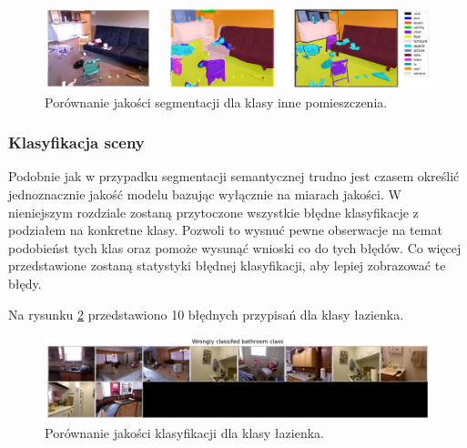 \begin{figure}[ht!]
    \centering
    \includegraphics[width=\textwidth]{img/preds_analysis/gt_vs_pred/other_indoor-3.png}
    \caption{Porównanie jakości segmentacji dla klasy inne pomieszczenia.}
    \label{fig:other_indoor-pred-3}
\end{figure}

\subsubsection{Klasyfikacja sceny}
Podobnie jak w przypadku segmentacji semantycznej trudno jest czasem określić jednoznacznie jakość modelu bazując wyłącznie na miarach jakości. W nieniejszym rozdziale zostaną przytoczone wszystkie błędne klasyfikacje z podziałem na konkretne klasy. Pozwoli to wysnuć pewne obserwacje na temat podobieńst tych klas oraz pomoże wysunąć wnioski co do tych błędów. Co więcej przedstawione zostaną statystyki błędnej klasyfikacji, aby lepiej zobrazować te błędy.

Na rysunku \ref{fig:bathroom-false-pred} przedstawiono 10 błędnych przypisań dla klasy łazienka.  
\begin{figure}[ht!]
    \centering
    \includegraphics[width=\textwidth]{img/preds_analysis/classification/bathroom.png}
    \caption{Porównanie jakości klasyfikacji dla klasy łazienka.}
    \label{fig:bathroom-false-pred}
\end{figure}

